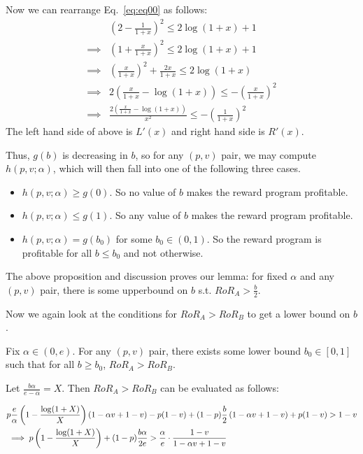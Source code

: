 Now we can rearrange Eq.~\ref{eq:eq00} as follows:
\begin{align*}
& \left(2-\frac{1}{1+x}\right)^2 \le 2\log(1+x) + 1\\
\implies & (1 + \frac{x}{1+x})^2 \le 2\log(1+x) + 1\\
\implies & (\frac{x}{1+x})^2 + \frac{2x}{1+x} \le 2\log(1+x)\\
\implies & 2\left(\frac{x}{1+x} - \log(1+x)\right) \le - (\frac{x}{1+x})^2\\
\implies & \frac{2\left(\frac{x}{1+x} - \log(1+x)\right)}{x^2} \le - (\frac{1}{1+x})^2
\end{align*}
The left hand side of above is $L'(x)$ and right hand side is $R'(x)$.

\endproof

Thus, $g(b)$ is decreasing in $b$, so for any $(p,v)$ pair, we may compute $h(p, v; \alpha)$, which will then fall into one of the following three cases.
\begin{itemize}
\item
$h(p,v;\alpha) \geq g(0)$. So no value of $b$ makes the reward program profitable.
\item
$h(p,v;\alpha) \leq g(1)$. So any value of $b$ makes the reward program profitable.
\item
$h(p,v;\alpha) = g(b_0)$ for some $b_0 \in (0,1)$. So the reward program is profitable for all $b \leq b_0$ and not otherwise.
\end{itemize}

The above proposition and discussion proves our lemma: for fixed $\alpha$ and any $(p,v)$ pair, there is some upperbound on $b$ s.t. $RoR_A > \frac{b}{2}$. 
\endproof

Now we again look at the conditions for $RoR_A > RoR_B$ to get a lower bound on $b$.  
\begin{lemma}
Fix $\alpha \in (0, e)$. For any $(p,v)$ pair, there exists some lower bound $b_0 \in [0,1]$ such that for all $b \geq b_0$, $RoR_A > RoR_B$.
\end{lemma}

\proof
Let $\frac{b\alpha}{e-\alpha} = X$. Then $RoR_A > RoR_B$ can be evaluated as follows:

\begin{eqnarray}
& p\frac{e}{\alpha}\left(1-\frac{\log(1+X)}{X}\right)(1-\alpha v + 1 - v) - p(1-v) + (1-p)\frac{b}{2}\left(1-\alpha v + 1-v\right) + p(1-v) > 1-v\notag\\
& \implies p\left(1 - \frac{\log(1+X)}{X}\right) + (1-p)\frac{b\alpha}{2e} > \frac{\alpha}{e} \cdot \frac{1-v}{1-\alpha v + 1 - v}\label{eq:ra>rb}
\end{eqnarray}

